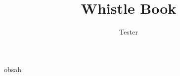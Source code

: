 \documentclass[chorded]{velkyzpevnik}
\title{Whistle Book}
\author{Tester}
\begin{document}
\begin{songs}{obsah}

    

\end{songs}
\end{document}
